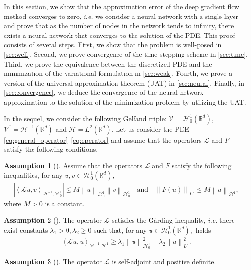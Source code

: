 \documentclass[11pt,a4paper,reqno]{amsart}
\numberwithin{equation}{section}
\theoremstyle{plain}
\theoremstyle{definition}
\newtheorem{assumption}{Assumption}
\newenvironment{namedassumption}[2][]
  {\renewcommand\theassumption{#2}\begin{assumption}[#1]}
  {\end{assumption}}
\newcommand{\ip}[1]{\left\langle#1\right\rangle}
\newcommand{\cL}{\mathcal{L}}
\newcommand{\cH}{\mathcal{H}}
\newcommand{\R}{\mathbb{R}}
\newcommand{\norm}[1]{\left\|#1 \right\|} %
\newcommand{\abs}[1]{\left|#1\right|} %
\begin{document}
In this section, we show that the approximation error of the deep gradient flow method converges to zero, \emph{i.e.} we consider a neural network with a single layer and prove that as the number of nodes in the network tends to infinity, there exists a neural network that converges to the solution of the PDE. This proof consists of several steps. 
First, we show that the problem is well-posed in \cref{sec:well}. 
Second, we prove convergence of the time-stepping scheme in \cref{sec:time}. 
Third, we prove the equivalence between the discretized PDE and the minimization of the variational formulation in \cref{sec:weak}. 
Fourth, we prove a version of the universal approximation theorem (UAT) in \cref{sec:neural}. 
Finally, in \cref{sec:convergence}, we deduce the convergence of the neural network approximation to the solution of the minimization problem by utilizing the UAT. 

In the sequel, we consider the following Gelfand triple: $\mathcal{V}=\cH_0^1(\R^d)$, $\mathcal{V}^*=\cH^{-1}(\R^d)$ and $\mathcal{H}=L^2(\R^d)$.
Let us consider the PDE \eqref{eq:general_operator}--\eqref{eq:operator} and assume that the operators $\cL$ and $F$ satisfy the following conditions.

\begin{namedassumption}{(CON)}
\label{ass:bound} 
Assume that the operators $\cL$ and $F$ satisfy the following inequalities, for any $u,v\in \cH_0^1(\R^d)$,
\begin{align*}
\abs{\ip{\cL  u,  v}_{\cH^{-1},\cH_0^1}} \le M \norm{u}_{\cH_0^1 } \norm{v}_{\cH_0^1 }
    \quad \text{and} \quad
\norm{F(u)}_{L^2}\le M \norm{u}_{\cH_0^1 },
\end{align*}
where $M>0$ is a constant.
\end{namedassumption}

\begin{namedassumption}{(G\AA)}
\label{ass:ellip}
The operator $\cL$ satisfies the G\aa rding inequality, \emph{i.e.} there exist constants $\lambda_1>0,\lambda_2\ge 0$ such that, for any $u\in \cH_0^1(\R^d),$ holds
\begin{align*}
\ip{\cL  u,  u}_{\cH^{-1},\cH_0^1} \ge  \lambda_1\norm{u}_{\cH_0^1}^2 - \lambda_2 \norm{u}^2_{L^2}.
\end{align*}
\end{namedassumption}

\begin{namedassumption}{(SA)}
\label{ass:SA-PD}
The operator $\mathcal L$ is self-adjoint and positive definite.
\end{namedassumption}
\end{document}
